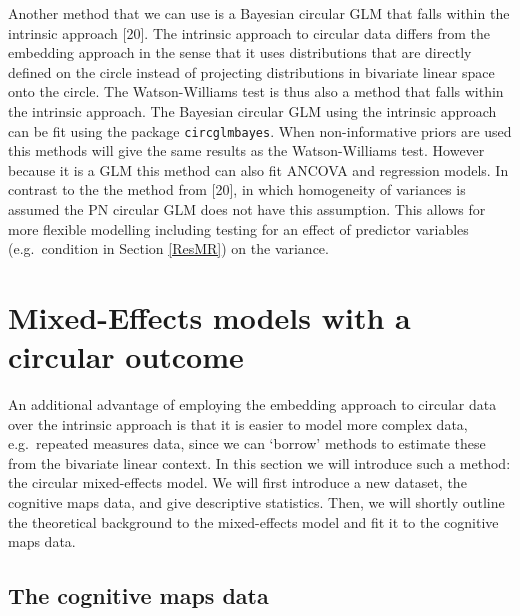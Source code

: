 \documentclass[11pt,]{article}
\begin{document}
Another method that we can use is a Bayesian circular GLM that falls
within the intrinsic approach {[}20{]}. The intrinsic approach to
circular data differs from the embedding approach in the sense that it
uses distributions that are directly defined on the circle instead of
projecting distributions in bivariate linear space onto the circle. The
Watson-Williams test is thus also a method that falls within the
intrinsic approach. The Bayesian circular GLM using the intrinsic
approach can be fit using the package \verb|circglmbayes|. When
non-informative priors are used this methods will give the same results
as the Watson-Williams test. However because it is a GLM this method can
also fit ANCOVA and regression models. In contrast to the the method
from {[}20{]}, in which homogeneity of variances is assumed the PN
circular GLM does not have this assumption. This allows for more
flexible modelling including testing for an effect of predictor
variables (e.g.~condition in Section \ref{ResMR}) on the variance.

\section{Mixed-Effects models with a circular outcome}\label{MEModel}

An additional advantage of employing the embedding approach to circular
data over the intrinsic approach is that it is easier to model more
complex data, e.g.~repeated measures data, since we can `borrow' methods
to estimate these from the bivariate linear context. In this section we
will introduce such a method: the circular mixed-effects model. We will
first introduce a new dataset, the cognitive maps data, and give
descriptive statistics. Then, we will shortly outline the theoretical
background to the mixed-effects model and fit it to the cognitive maps
data.

\subsection{The cognitive maps data}\label{CogMap}
\end{document}
